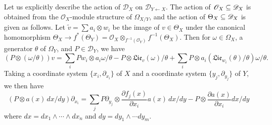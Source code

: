 Let us explicitly describe the action of $\mathscr{D}_X$ on $\mathscr{D}_{Y\leftarrow X}$. The action of $\mathscr{O}_X\subseteq\mathscr{D}_X$ is obtained from the $\mathscr{O}_X$-module structure of $\Omega_{X/Y}$, and the action of $\Theta_X\subseteq\mathscr{D}_X$ is given as follows. Let $\tilde{v}=\sum a_i\otimes w_i$ be the image of $v\in\Theta_X$ under the canonical homomorphism $\Theta_X\to f^*(\Theta_Y)=\mathscr{O}_X\otimes_{f^{-1}(\mathscr{O}_Y)}f^{-1}(\Theta_X)$. Then for $\omega\in\Omega_X$, a generator $\theta$ of $\Omega_Y$, and $P\in\mathscr{D}_Y$, we have
\begin{equation}\label{D-module direct image relative module action def-1}
(P\otimes(\omega/\theta))v=\sum_iPw_i\otimes a_i\omega/\theta-P\otimes\mathfrak{Lie}_v(\omega)/\theta+\sum_iP\otimes a_i(\mathfrak{Lie}_{w_i}(\theta)/\theta)\omega/\theta.
\end{equation}
Taking a coordinate system $\{x_i,\partial_{x_i}\}$ of $X$ and a coordinate system $\{y_j,\partial_{y_j}\}$ of $Y$, we then have
\begin{equation}\label{D-module direct image relative module action def-2}
(P\otimes a(x)\,dx/dy)\partial_{x_i}=\sum_jP\partial_{y_j}\otimes\frac{\partial f_j(x)}{\partial x_i}a(x)\,dx/dy-P\otimes\frac{\partial a(x)}{\partial x_i}dx/dy
\end{equation}
where $dx=dx_1\wedge\cdots\wedge dx_n$ and $dy=dy_1\wedge\cdots dy_m$.

